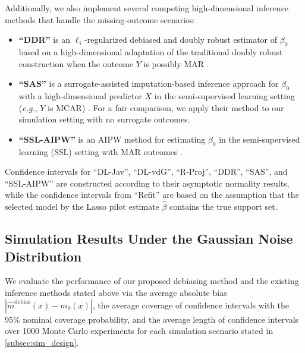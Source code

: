 \documentclass[ejsv2,noshowframe]{imsart}
\theoremstyle{plain}
\theoremstyle{definition}
\theoremstyle{remark}
\renewcommand{\hat}{\widehat}
\begin{document}
Additionally, we also implement several competing high-dimensional inference methods that handle the missing-outcome scenarios:
\begin{itemize}
	\item {\bf ``DDR''} is an $\ell_1$-regularized debiased and doubly robust estimator of $\beta_0$ based on a high-dimensional adaptation of the traditional doubly robust construction when the outcome $Y$ is possibly MAR \citep{chakrabortty2019high}.
	
	\item {\bf ``SAS''} is a surrogate-assisted imputation-based inference approach for $\beta_0$ with a high-dimensional predictor $X$ in the semi-supervised learning setting (\emph{e.g.}, $Y$ is MCAR) \citep{hou2023surrogate}. For a fair comparison, we apply their method to our simulation setting with no surrogate outcomes.
	
	\item {\bf ``SSL-AIPW''} is an AIPW method for estimating $\beta_0$ in the semi-supervised learning (SSL) setting with MAR outcomes \citep{tian2024semi}.
\end{itemize}

Confidence intervals for ``DL-Jav'', ``DL-vdG'', ``R-Proj'', ``DDR'', ``SAS'', and ``SSL-AIPW'' are constructed according to their asymptotic normality results, while the confidence intervals from ``Refit'' are based on the assumption that the selected model by the Lasso pilot estimate $\hat{\beta}$ contains the true support set.

\subsection{Simulation Results Under the Gaussian Noise Distribution}
\label{subsec:sim_results}

We evaluate the performance of our proposed debiasing method and the existing inference methods stated above via the average absolute bias $\left|\hat{m}^{\mathrm{debias}}(x) - m_0(x) \right|$, the average coverage of confidence intervals with the 95\% nominal coverage probability, and the average length of confidence intervals over 1000 Monte Carlo experiments for each simulation scenario stated in \autoref{subsec:sim_design}. 
\end{document}
